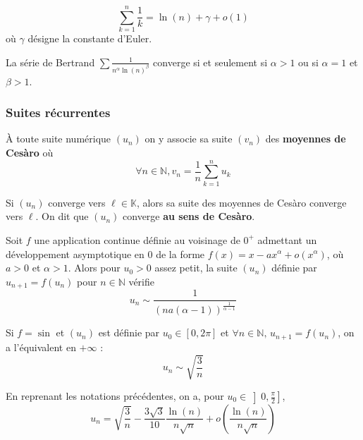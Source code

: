 	\begin{application}
		\[ \sum_{k=1}^n \frac{1}{k} = \ln(n) + \gamma + o (1) \]
		où $\gamma$ désigne la constante d'Euler.
	\end{application}
	
	\begin{application}
		La série de Bertrand $\sum \frac{1}{n^\alpha \ln(n)^\beta}$ converge si et seulement si $\alpha > 1$ ou si $\alpha = 1$ et $\beta > 1$.
	\end{application}
	
	\subsubsection{Suites récurrentes}
	
	
	\begin{definition}
		À toute suite numérique $(u_n)$ on y associe sa suite $(v_n)$ des \textbf{moyennes de Cesàro} où
		\[ \forall n \in \mathbb{N}, v_n = \frac{1}{n} \sum_{k=1}^{n} u_k \]
	\end{definition}
	
	\begin{theorem}
		Si $(u_n)$ converge vers $\ell \in \mathbb{K}$, alors sa suite des moyennes de Cesàro converge vers $\ell$. On dit que $(u_n)$ converge \textbf{au sens de Cesàro}.
	\end{theorem}
	
	
	\begin{proposition}
		Soit $f$ une application continue définie au voisinage de $0^+$ admettant
		un développement asymptotique en $0$ de la forme $f(x) = x - ax^\alpha + o(x^\alpha)$, où $a > 0$ et $\alpha > 1$. Alors pour $u_0 > 0$ assez petit, la suite $(u_n)$ définie par $u_{n+1} = f(u_n)$ pour $n \in \mathbb{N}$ vérifie
		\[ u_n \sim \frac{1}{(na(\alpha-1))^{\frac{1}{\alpha-1}}} \]
	\end{proposition}
	
	\begin{example}
		Si $f = \sin$ et $(u_n)$ est définie par $u_0 \in [0, 2\pi]$ et $\forall n \in \mathbb{N}, \, u_{n+1} = f(u_n)$, on a l'équivalent en $+\infty$ :
		\[ u_n \sim \sqrt{\frac{3}{n}} \]
	\end{example}
	
	
	\begin{proposition}
		En reprenant les notations précédentes, on a, pour $u_0 \in \left] 0, \frac{\pi}{2} \right]$,
		\[ u_n = \sqrt{\frac{3}{n}} - \frac{3 \sqrt{3}}{10} \frac{\ln(n)}{n\sqrt{n}} + o\left( \frac{\ln(n)}{n\sqrt{n}} \right) \]
	\end{proposition}
	

